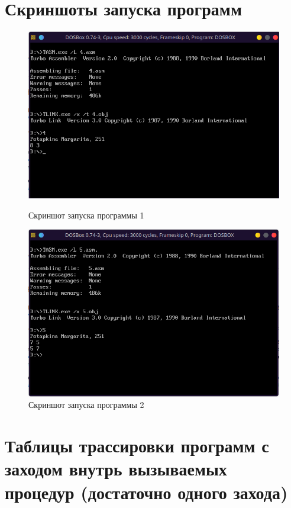 \documentclass[bachelor, och, otchet]{../SCWorks}
\begin{document}
\section{Скриншоты запуска программ}
\begin{figure}[H]
\centering
\includegraphics[scale=0.9]{4.png}
\caption {Скриншот запуска программы 1}
\includegraphics[scale=0.9]{5.png}
\caption {Скриншот запуска программы 2}
\end{figure}

\section{Таблицы трассировки программ с заходом внутрь вызываемых процедур (достаточно одного захода)}
\tiny



\normalsize
\end{document}
